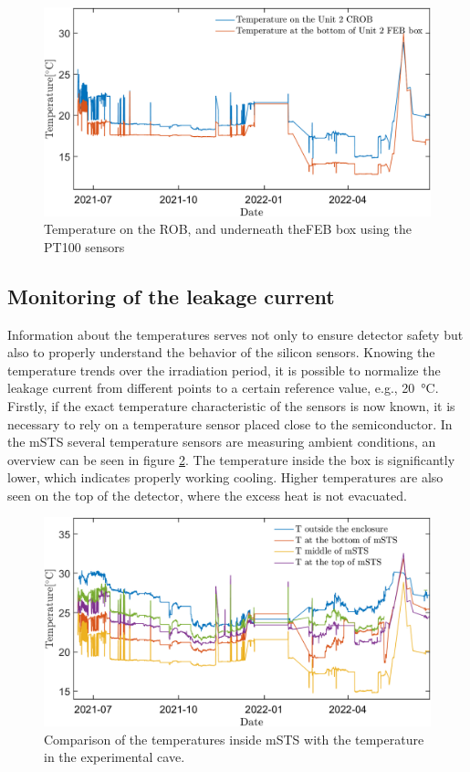 \begin{figure}[!h]
\centering
\includegraphics[width=0.9\columnwidth]{Chapter6/DCS/images/ROBvsFEB.png}
\caption{Temperature on the \gls{ROB}, and underneath the\gls{FEB} box using the PT100 sensors}
\label{fig_robvsfeb}
\end{figure}

\newpage

\subsection{Monitoring of the leakage current}

Information about the temperatures serves not only to ensure detector safety but also to properly understand the behavior of the silicon sensors. Knowing the temperature trends over the irradiation period, it is possible to normalize the leakage current from different points to a certain reference value, e.g., \SI{20}{\celsius}. Firstly, if the exact temperature characteristic of the sensors is now known, it is necessary to rely on a temperature sensor placed close to the semiconductor. In the \gls{mSTS} several temperature  sensors are measuring ambient conditions, an overview can be seen in figure \ref{fig_temperatures}. The temperature inside the box is significantly lower, which indicates properly working cooling. Higher temperatures are also seen on the top of the detector, where the excess heat is not evacuated. 

\begin{figure}[!h]
\centering
\includegraphics[width=0.9\columnwidth]{Chapter6/DCS/images/rates/tempmSTS.png}
\caption{Comparison of the temperatures inside \gls{mSTS} with the temperature in the experimental cave.}
\label{fig_temperatures}
\end{figure}

